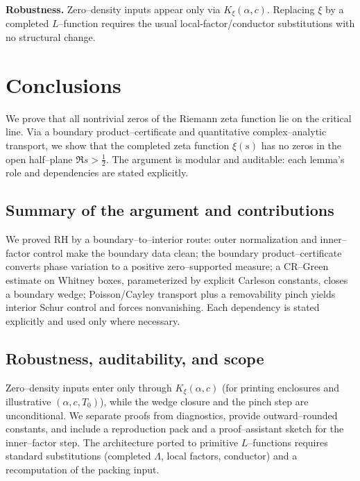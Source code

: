 \documentclass[11pt]{article}
\theoremstyle{definition}
\theoremstyle{remark}
\begin{document}
\noindent\textbf{Robustness.} Zero–density inputs appear only via $K_\xi(\alpha,c)$. Replacing $\xi$ by a completed $L$–function requires the usual local‑factor/conductor substitutions with no structural change.

\par\normalfont\normalsize
\section{Conclusions}
We prove that all nontrivial zeros of the Riemann zeta function lie on the critical line. Via a boundary product--certificate and quantitative complex--analytic transport, we show that the completed zeta function $\xi(s)$ has no zeros in the open half--plane $\Re s>\tfrac12$. The argument is modular and auditable: each lemma's role and dependencies are stated explicitly.


\subsection*{Summary of the argument and contributions}
We proved RH by a boundary--to--interior route: outer normalization and inner--factor control make the boundary data clean; the boundary product--certificate converts phase variation to a positive zero--supported measure; a CR--Green estimate on Whitney boxes, parameterized by explicit Carleson constants, closes a boundary wedge; Poisson/Cayley transport plus a removability pinch yields interior Schur control and forces nonvanishing. Each dependency is stated explicitly and used only where necessary.

\subsection*{Robustness, auditability, and scope}
Zero--density inputs enter only through $K_\xi(\alpha,c)$ (for printing enclosures and illustrative $(\alpha,c,T_0)$), while the wedge closure and the pinch step are unconditional. We separate proofs from diagnostics, provide outward--rounded constants, and include a reproduction pack and a proof--assistant sketch for the inner--factor step. The architecture ported to primitive $L$--functions requires standard substitutions (completed $\Lambda$, local factors, conductor) and a recomputation of the packing input.
\end{document}
